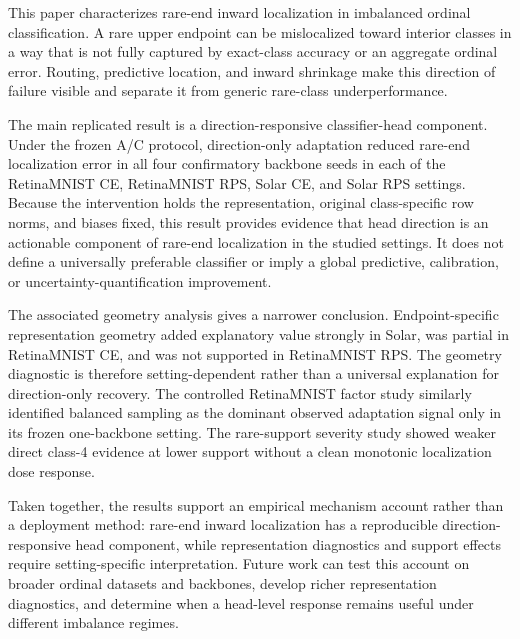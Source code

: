 This paper characterizes rare-end inward localization in imbalanced ordinal
classification. A rare upper endpoint can be mislocalized toward interior
classes in a way that is not fully captured by exact-class accuracy or an
aggregate ordinal error. Routing, predictive location, and inward shrinkage
make this direction of failure visible and separate it from generic rare-class
underperformance.

The main replicated result is a direction-responsive classifier-head component.
Under the frozen A/C protocol, direction-only adaptation reduced rare-end
localization error in all four confirmatory backbone seeds in each of the
RetinaMNIST CE, RetinaMNIST RPS, Solar CE, and Solar RPS settings. Because the
intervention holds the representation, original class-specific row norms, and
biases fixed, this result provides evidence that head direction is an actionable
component of rare-end localization in the studied settings. It does not define
a universally preferable classifier or imply a global predictive, calibration,
or uncertainty-quantification improvement.

The associated geometry analysis gives a narrower conclusion. Endpoint-specific
representation geometry added explanatory value strongly in Solar, was partial
in RetinaMNIST CE, and was not supported in RetinaMNIST RPS. The geometry
diagnostic is therefore setting-dependent rather than a universal explanation
for direction-only recovery. The controlled RetinaMNIST factor study similarly
identified balanced sampling as the dominant observed adaptation signal only in
its frozen one-backbone setting. The rare-support severity study showed weaker
direct class-4 evidence at lower support without a clean monotonic localization
dose response.

Taken together, the results support an empirical mechanism account rather than
a deployment method: rare-end inward localization has a reproducible
direction-responsive head component, while representation diagnostics and
support effects require setting-specific interpretation. Future work can test
this account on broader ordinal datasets and backbones, develop richer
representation diagnostics, and determine when a head-level response remains
useful under different imbalance regimes.
